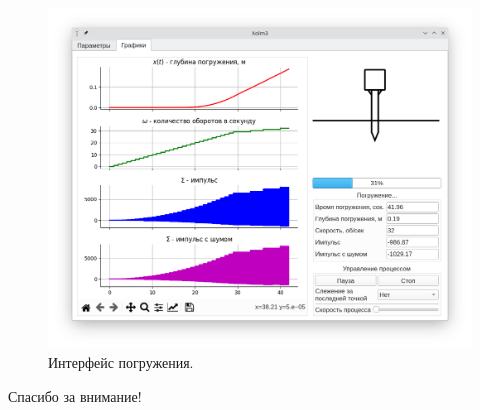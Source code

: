 \documentclass[10pt, pdf, hyperref={unicode}]{beamer}
\begin{document}
\begin{frame}
\begin{center}
\begin{minipage}[h]{0.97\linewidth}
\begin{minipage}[h]{0.49\linewidth}
\begin{figure}[h]
                        \includegraphics[width=1\linewidth]{../img/xolm_3_linux_graps.png}
                        \caption{Интерфейс погружения.}
                    \end{figure}
                \end{minipage}
            \end{minipage}
        \end{center}
    \end{frame}


    \begin{frame}
        \begin{alertblock}{}
            \centerline{\large Спасибо за внимание!}
        \end{alertblock}
    \end{frame}
\end{document}
